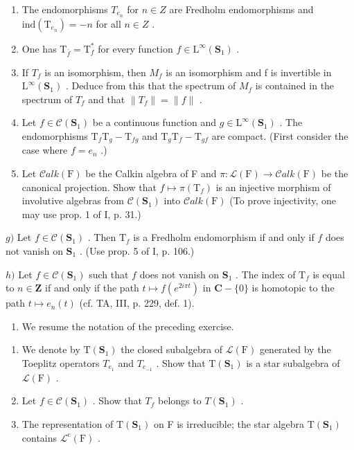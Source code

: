 \begin{enumerate}
\def\labelenumi{\alph{enumi})}
\setcounter{enumi}{1}
\item
  The endomorphisms \(T_{e_{n}}\) for \(n \in Z\) are Fredholm endomorphisms and \(\text{ind}(\mathrm{T}_{e_{n}}) = -n\) for all \(n \in Z\) .
\item
  One has \(\mathrm{T}_{\overline{f}} = \mathrm{T}_f^*\) for every function \(f\in \mathrm{L}^{\infty}(\mathbf{S}_1)\) .
\item
  If \(T_{f}\) is an isomorphism, then \(M_{f}\) is an isomorphism and f is invertible in \(\mathrm{L}^{\infty}(\mathbf{S}_{1})\) . Deduce from this that the spectrum of \(M_{f}\) is contained in the spectrum of \(T_{f}\) and that \(\|T_{f}\|=\|f\|\) .
\item
  Let \(f \in \mathcal{C}(\mathbf{S}_1)\) be a continuous function and \(g \in \mathrm{L}^{\infty}(\mathbf{S}_1)\) . The endomorphisms \(\mathrm{T}_f\mathrm{T}_g - \mathrm{T}_{fg}\) and \(\mathrm{T}_g\mathrm{T}_f - \mathrm{T}_{gf}\) are compact. (First consider the case where \(f = e_n\) .)
\item
  Let \(\mathcal{C}alk(\mathrm{F})\) be the Calkin algebra of F and \(\pi\colon\mathcal{L}(\mathrm{F})\to\mathcal{C}alk(\mathrm{F})\) be the canonical projection. Show that \(f\mapsto\pi(\mathrm{T}_{f})\) is an injective morphism of involutive algebras from \(\mathcal{C}(\mathbf{S}_{1})\) into \(\mathcal{C}alk(\mathrm{F})\) (To prove injectivity, one may use prop. 1 of I, p. 31.)
\end{enumerate}

\(g)\) Let \(f \in \mathcal{C}(\mathbf{S}_1)\) . Then \(\mathrm{T}_f\) is a Fredholm endomorphism if and only if \(f\) does not vanish on \(\mathbf{S}_1\) . (Use prop. 5 of I, p. 106.)

\(h)\) Let \(f \in \mathcal{C}(\mathbf{S}_1)\) such that \(f\) does not vanish on \(\mathbf{S}_1\) . The index of \(\mathrm{T}_f\) is equal to \(n \in \mathbf{Z}\) if and only if the path \(t \mapsto f(e^{2i\pi t})\) in \(\mathbf{C} - \{0\}\) is homotopic to the path \(t \mapsto e_n(t)\) (cf. TA, III, p. 229, def. 1).

\begin{enumerate}
\def\labelenumi{\arabic{enumi})}
\setcounter{enumi}{7}
\tightlist
\item
  We resume the notation of the preceding exercise.
\end{enumerate}

\begin{enumerate}
\def\labelenumi{\alph{enumi})}
\item
  We denote by \(\mathrm{T}(\mathbf{S}_{1})\) the closed subalgebra of \(\mathcal{L}(\mathrm{F})\) generated by the Toeplitz operators \(T_{e_{1}}\) and \(T_{e_{-1}}\) . Show that \(\mathrm{T}(\mathbf{S}_{1})\) is a star subalgebra of \(\mathcal{L}(\mathrm{F})\) .
\item
  Let \(f \in \mathcal{C}(\mathbf{S}_1)\) . Show that \(T_f\) belongs to \(T(\mathbf{S}_1)\) .
\item
  The representation of \(\mathrm{T}(\mathbf{S}_{1})\) on F is irreducible; the star algebra \(\mathrm{T}(\mathbf{S}_{1})\) contains \(\mathcal{L}^{\mathrm{c}}(\mathrm{F})\) .
\end{enumerate}

